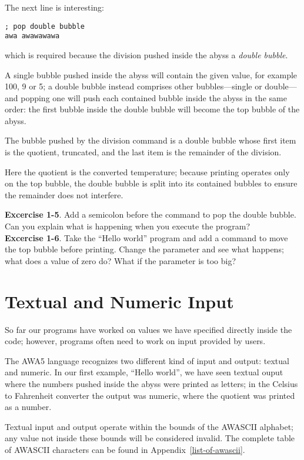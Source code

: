 \documentclass[11pt,a4paper,draft]{book}
\begin{document}
The next line is interesting:
\begin{verbatim}
; pop double bubble
awa awawawawa
\end{verbatim}

which is required because the division pushed inside the abyss a
\emph{double bubble}.

A single bubble pushed inside the abyss will contain the given value,
for example 100, 9 or 5; a double bubble instead comprises other
bubbles---single or double---and popping one will push each contained
bubble inside the abyss in the same order: the first bubble inside the
double bubble will become the top bubble of the abyss.

The bubble pushed by the division command is a double bubble whose
first item is the quotient, truncated, and the last item is the
remainder of the division.

Here the quotient is the converted temperature; because printing
operates only on the top bubble, the double bubble is split into its
contained bubbles to ensure the remainder does not interfere.

\textbf{Excercise 1-5}. Add a semicolon before the command to pop the
double bubble. Can you explain what is happening when you execute the
program? \\
\textbf{Excercise 1-6}. Take the \enquote{Hello world} program and add
a command to move the top bubble before printing. Change the parameter
and see what happens; what does a value of zero do? What if the
parameter is too big?

\section{Textual and Numeric Input}
So far our programs have worked on values we have specified directly
inside the code; however, programs often need to work on input
provided by users.

The AWA5 language recognizes two different kind of input and output:
textual and numeric. In our first example, \enquote{Hello world}, we
have seen textual ouput where the numbers pushed inside the abyss were
printed as letters; in the Celsius to Fahrenheit converter the output
was numeric, where the quotient was printed as a number.

Textual input and output operate within the bounds of the AWASCII
alphabet; any value not inside these bounds will be considered
invalid. The complete table of AWASCII characters can be found in
Appendix~\ref{list-of-awascii}.
\end{document}
